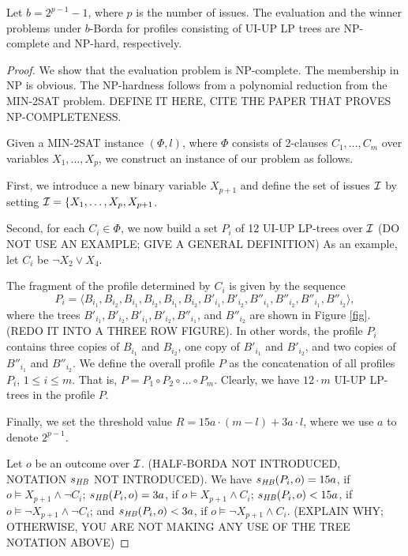 \begin{thm}
\label{thm5}
Let $b=2^{p-1}-1$, where $p$ is the number of issues. The evaluation 
 and the winner problems under $b$-Borda for profiles consisting of 
	UI-UP LP trees are NP-complete and NP-hard, respectively.
\end{thm}
\begin{proof}
We show that the evaluation problem is NP-complete. The membership
in NP is obvious. The NP-hardness follows from a polynomial reduction 
from the MIN-2SAT problem. DEFINE IT HERE, CITE THE PAPER THAT PROVES
NP-COMPLETENESS.

Given a MIN-2SAT instance $(\Phi,l)$, where $\Phi$ consists of 2-clauses 
$C_1,\ldots,C_m$ over variables $X_1,\ldots,X_p$, we construct an 
instance of our problem as follows.
	
First, we introduce a new binary variable $X_{p+1}$ and define the set of
issues $\mathcal{I}$ by setting $\mathcal{I}=\{X_1,\ldots, X_p,X_{p+1}$. 

Second, for each $C_i \in \Phi$, we now build a set $P_i$ of 12 UI-UP 
LP-trees over $\mathcal{I}$  (DO NOT USE AN EXAMPLE; GIVE A GENERAL DEFINITION)
As an example, let $C_i$ be $\neg X_2 \lor X_4$. 


The fragment of the profile determined by $C_i$ is given by the sequence 
\[
P_i= \langle B_{i_1},B_{i_2},B_{i_1},B_{i_2},B_{i_1},B_{i_2}, 
B'_{i_1},B'_{i_2},
B''_{i_1},B''_{i_2},B''_{i_1},B''_{i_2}\rangle,
\]
where the trees $B'_{i_1}, B'_{i_2},B'_{i_1}, B'_{i_2},B''_{i_1}$, and 
$B''_{i_2}$ are shown in Figure \ref{fig}. (REDO IT INTO A THREE ROW
FIGURE). In other words, the profile $P_i$ contains three copies of $B_{i_1}$
and $B_{i_2}$, one copy of $B'_{i_1}$ and $B'_{i_2}$, and two copies of
$B''_{i_1}$ and $B''_{i_2}$. We define the overall profile $P$ as the 
concatenation of all profiles $P_i$, $1\leq i\leq m$. That is,
$P=P_1\circ P_2 \circ\ldots\circ P_m$. Clearly, we have $12\cdot m$ 
UI-UP LP-trees in the profile $P$.

Finally, we set the threshold value $R=15a\cdot (m-l)+3a\cdot l$, where we use
$a$ to denote $2^{p-1}$.

Let $o$ be an outcome over $\mathcal{I}$. (HALF-BORDA NOT INTRODUCED, NOTATION 
$s_{\mathit{HB}}$ NOT INTRODUCED).
We have $s_{\mathit{HB}}(P_i,o)=15a$, if $o \models X_{p+1} \land \neg C_i$; 
$s_{\mathit{HB}}(P_i,o)=3a$, if $o \models X_{p+1} \land C_i$;
$s_{\mathit{HB}}(P_i,o)<15a$, if $o \models \neg X_{p+1} \land \neg C_i$; and
$s_{\mathit{HB}}(P_i,o)<3a$, if $o \models \neg X_{p+1} \land C_i$.
(EXPLAIN WHY; OTHERWISE, YOU ARE NOT MAKING ANY USE OF THE TREE NOTATION ABOVE)


\end{proof}
